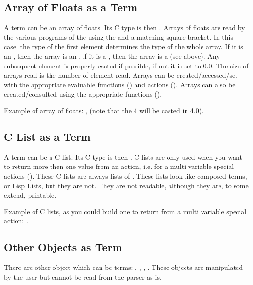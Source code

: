 \subsection{Array of Floats as a Term}

A term can be an array of floats. Its C type is then . Arrays
of floats are read by the various programs of the \COPRSDE{} using the \samp{[}
and a matching \samp{]} square bracket. In this case, the type of the first
element determines the type of the whole array. If it is an , then
the array is an , if it is a , then the array is a
 (see above).  Any subsequent element is properly casted if
possible, if not it is set to 0.0.  The size of arrays read is the number of
element read. Arrays can be created/accessed/set with the appropriate evaluable
functions () and actions
(). Arrays can also be created/consulted
using the appropriate functions ().

Example of array of floats: \code{[ 1.5 4.2 4.0 5.888 0.0 3e4 3.1415]},
\code{[1.0 3.0 4 5.123 7123.123]} (note that the 4 will be casted in 4.0).


\subsection{C List as a Term}

A term can be a C list. Its C type is then . C lists are only
used when you want to return more then one value from an action, i.e. for a
multi variable special actions (). These
C lists are always lists of . These lists look like composed terms,
or Lisp Lists, but they are not. They are not readable, although they are, to
some extend, printable.

Example of C lists, as you could build one to return from a multi variable
special action: .

\subsection{Other Objects as Term}

There are other object which can be terms: , ,
, .  These objects are manipulated by
the user but cannot be read from the parser as is.

